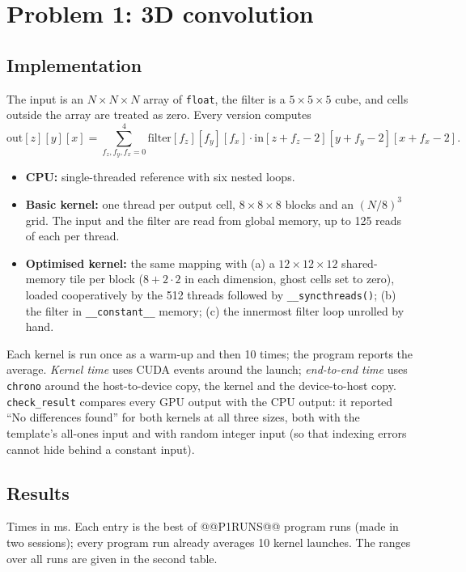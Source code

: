 \documentclass[11pt]{article}
\begin{document}
\section*{Problem 1: 3D convolution}

\subsection*{Implementation}
The input is an $N\times N\times N$ array of \texttt{float}, the filter is a
$5\times5\times5$ cube, and cells outside the array are treated as zero.
Every version computes
\[
\mathrm{out}[z][y][x]=\sum_{f_z,f_y,f_x=0}^{4}
 \mathrm{filter}[f_z][f_y][f_x]\cdot \mathrm{in}[z+f_z-2][y+f_y-2][x+f_x-2].
\]
\begin{itemize}
\item \textbf{CPU:} single-threaded reference with six nested loops.
\item \textbf{Basic kernel:} one thread per output cell, $8\times8\times8$
 blocks and an $(N/8)^3$ grid. The input and the filter are read from global
 memory, up to 125 reads of each per thread.
\item \textbf{Optimised kernel:} the same mapping with
 (a) a $12\times12\times12$ shared-memory tile per block ($8+2\cdot 2$ in each
 dimension, ghost cells set to zero), loaded cooperatively by the 512 threads
 followed by \texttt{\_\_syncthreads()};
 (b) the filter in \texttt{\_\_constant\_\_} memory;
 (c) the innermost filter loop unrolled by hand.
\end{itemize}
Each kernel is run once as a warm-up and then 10 times; the program reports
the average. \emph{Kernel time} uses CUDA events around the launch;
\emph{end-to-end time} uses \texttt{chrono} around the host-to-device copy,
the kernel and the device-to-host copy. \texttt{check\_result} compares every
GPU output with the CPU output: it reported ``No differences found'' for both
kernels at all three sizes, both with the template's all-ones input and with
random integer input (so that indexing errors cannot hide behind a constant
input).

\subsection*{Results}
Times in ms. Each entry is the best of @@P1RUNS@@ program runs (made in two
sessions); every program run already averages 10 kernel launches. The ranges
over all runs are given in the second table.
\end{document}
